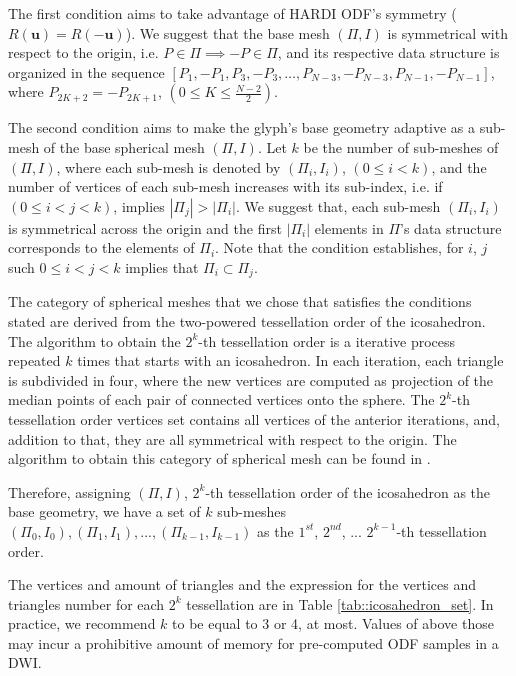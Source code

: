 \documentclass[twoside,twocolumn,10pt]{article}
\begin{document}
The first condition aims to take advantage of HARDI ODF's symmetry ($R(\bm{u}) = R(-\bm{u})$). We suggest that the base mesh $(\Pi, I)$ is symmetrical with respect to the origin, i.e. $P \in \Pi \implies -P \in \Pi$, and its respective data structure is organized in the sequence $[P_1, -P_1, P_3, -P_3, \dots, P_{N-3}, -P_{N-3}, P_{N-1}, -P_{N-1}]$, where $P_{2K+2} = -P_{2K+1}$, $(0 \leq K \leq \frac{N-2}{2})$.

The second condition aims to make the glyph's base geometry adaptive as a sub-mesh of the base spherical mesh $(\Pi, I)$. Let $k$ be the number of sub-meshes of $(\Pi, I)$, where each sub-mesh is denoted by $(\Pi_i, I_i)$,  $(0 \leq i < k)$, and the number of vertices of each sub-mesh increases with its sub-index, i.e. if  $(0 \leq i < j < k)$, implies $|\Pi_j| > |\Pi_i|$. We suggest that, each sub-mesh $(\Pi_i, I_i)$ is symmetrical across the origin and the first $|\Pi_i|$ elements in  $\Pi$'s data structure corresponds to the elements of $\Pi_i$. Note that the condition establishes, for $i$, $j$ such $0 \leq i < j < k$ implies that $\Pi_i \subset \Pi_j$.

The category of spherical meshes that we chose that satisfies the conditions stated are derived from the two-powered tessellation order of the icosahedron. The algorithm to obtain the $2^k$-th tessellation order is a iterative process repeated $k$ times that starts with an icosahedron. In each iteration, each triangle is subdivided in four, where the new vertices are computed as projection of the median points of each pair of connected vertices onto the sphere. The $2^k$-th tessellation order vertices set contains all vertices of the anterior iterations, and, addition to that, they are all symmetrical with respect to the origin. The algorithm to obtain this category of spherical mesh can be found in \cite{luna2012}.

Therefore, assigning $(\Pi, I)$, $2^{k}$-th tessellation order of the icosahedron as the base geometry, we have a set of $k$ sub-meshes $(\Pi_0, I_0), (\Pi_1, I_1), ..., (\Pi_{k-1}, I_{k-1})$ as the $1^{st}$, $2^{nd}$, ... $2^{k-1}$-th tessellation order.




The vertices and amount of triangles and the expression for the vertices and triangles number for each $2^k$ tessellation are in Table \ref{tab::icosahedron_set}. In practice, we recommend $k$ to be equal to 3 or 4, at most. Values of above those may incur a prohibitive amount of memory for pre-computed ODF samples in a DWI.
\end{document}
